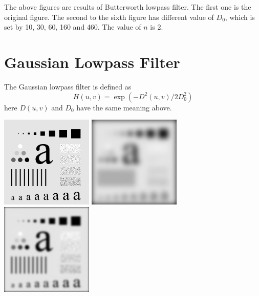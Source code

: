 \documentclass{article}
\begin{document}
The above figures are results of Butterworth lowpass filter. The first one is the original figure. The second to the sixth figure has different value of $D_0$, which is set by 10, 30, 60, 160 and 460. The value of $n$ is 2.

\section{Gaussian Lowpass Filter}
The Gaussian lowpass filter is defined as $$H(u,v)=\exp({-D^2(u,v)/2D_0^2})$$ here $D(u,v)$ and $D_0$ have the same meaning above.

\includegraphics[width=0.33\textwidth]{../data/characters_test_pattern.jpg}
\includegraphics[width=0.33\textwidth]{../data/gaussian_lowpass_10_characters_test_pattern.jpg}
\includegraphics[width=0.33\textwidth]{../data/gaussian_lowpass_30_characters_test_pattern.jpg}
\end{document}
